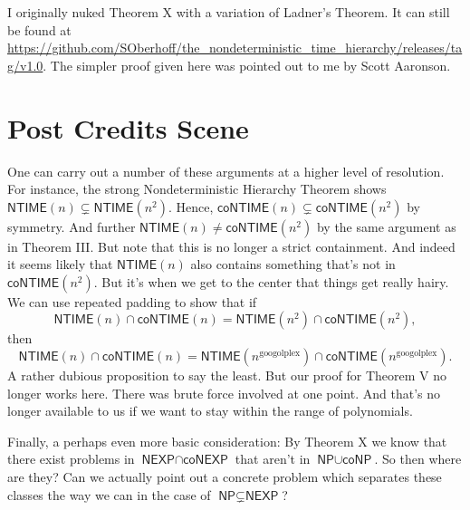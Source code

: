 \documentclass{article}
\newcommand{\NTIME}{\ensuremath{\textsf{NTIME}}}
\newcommand{\coNTIME}{\ensuremath{\textsf{coNTIME}}}
\newcommand{\NP}{\ensuremath{\textsf{NP}}}
\newcommand{\NEXP}{\ensuremath{\textsf{NEXP}}}
\newcommand{\interEXP}{\ensuremath{\textsf{NEXP}\cap\textsf{coNEXP}}}
\newcommand{\unionP}{\ensuremath{\textsf{NP}\cup\textsf{coNP}}}
\begin{document}
I originally nuked Theorem X with a variation of Ladner's Theorem. It can still be found at \url{https://github.com/SOberhoff/the_nondeterministic_time_hierarchy/releases/tag/v1.0}. The simpler proof given here was pointed out to me by Scott Aaronson.

\section*{Post Credits Scene}

One can carry out a number of these arguments at a higher level of resolution. For instance, the strong Nondeterministic Hierarchy Theorem shows $\NTIME(n) \subsetneq \NTIME\left(n^2\right)$. Hence, $\coNTIME(n) \subsetneq \coNTIME\left(n^2\right)$ by symmetry. And further $\NTIME(n) \neq \coNTIME\left(n^2\right)$ by the same argument as in Theorem III. But note that this is no longer a strict containment. And indeed it seems likely that $\NTIME(n)$ also contains something that's not in $\coNTIME\left(n^2\right)$. But it's when we get to the center that things get really hairy. We can use repeated padding to show that if
\[
\NTIME(n) \cap \coNTIME(n) = \NTIME\left(n^2\right) \cap \coNTIME\left(n^2\right),
\]
then
\[
\NTIME(n) \cap \coNTIME(n) = \NTIME\left(n^\text{googolplex}\right) \cap \coNTIME\left(n^\text{googolplex}\right).
\]
A rather dubious proposition to say the least. But our proof for Theorem V no longer works here. There was brute force involved at one point. And that's no longer available to us if we want to stay within the range of polynomials.

Finally, a perhaps even more basic consideration: By Theorem X we know that there exist problems in $\interEXP$ that aren't in $\unionP$. So then where are they? Can we actually point out a concrete problem which separates these classes the way we can in the case of $\NP \subsetneq \NEXP$?

\vfill\eject
\end{document}
